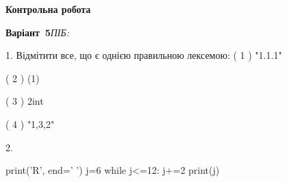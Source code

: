 \documentclass[11pt]{article}
\begin{document}
{\large\textbf{Контрольна робота}}

\textbf{Варіант \No\,5}\hfill \textit{ПІБ:}\,\underline{\hspace{60mm}}
\vspace{4mm}

1. %
Відмітити все, що є однією правильною лексемою:
( 1 ) "1.1.1"

( 2 ) (1)

( 3 ) 2int

( 4 ) "1,3,2"


2. 

print('R', end=' ')
j=6
while j<=12:
    j+=2
print(j)



\newpage
\end{document}

